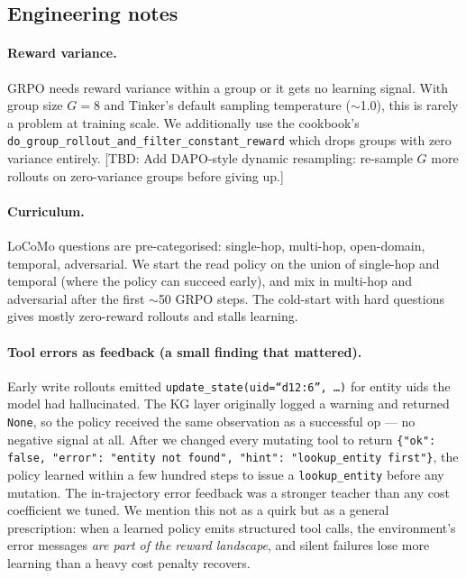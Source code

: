 \documentclass[11pt]{article}
\newcommand{\TBD}[1]{%
  \textcolor{red!80!black}{\textsf{[TBD: #1]}}}
\begin{document}
\subsection{Engineering notes}

\paragraph{Reward variance.} GRPO needs reward variance within a group
or it gets no learning signal. With group size $G=8$ and Tinker's default
sampling temperature ($\sim$1.0), this is rarely a problem at training
scale. We additionally use the cookbook's
\texttt{do\_group\_rollout\_and\_filter\_constant\_reward} which drops
groups with zero variance entirely. \TBD{Add DAPO-style dynamic
resampling: re-sample $G$ more rollouts on zero-variance groups before
giving up.}

\paragraph{Curriculum.} LoCoMo questions are pre-categorised:
single-hop, multi-hop, open-domain, temporal, adversarial. We start the
read policy on the union of single-hop and temporal (where the policy
can succeed early), and mix in multi-hop and adversarial after the first
$\sim$50 GRPO steps. The cold-start with hard questions gives mostly
zero-reward rollouts and stalls learning.

\paragraph{Tool errors as feedback (a small finding that mattered).}
Early write rollouts emitted \texttt{update\_state(uid=``d12:6'', \ldots)}
for entity uids the model had hallucinated. The KG layer originally
logged a warning and returned \texttt{None}, so the policy received the
same observation as a successful op --- no negative signal at all.
After we changed every mutating tool to return
\texttt{\{"ok": false, "error": "entity not found",
"hint": "lookup\_entity first"\}}, the policy learned within a few
hundred steps to issue a \texttt{lookup\_entity} before any mutation.
The in-trajectory error feedback was a stronger teacher than any cost
coefficient we tuned. We mention this not as a quirk but as a general
prescription: when a learned policy emits structured tool calls, the
environment's error messages \emph{are part of the reward landscape},
and silent failures lose more learning than a heavy cost penalty
recovers.
\end{document}
